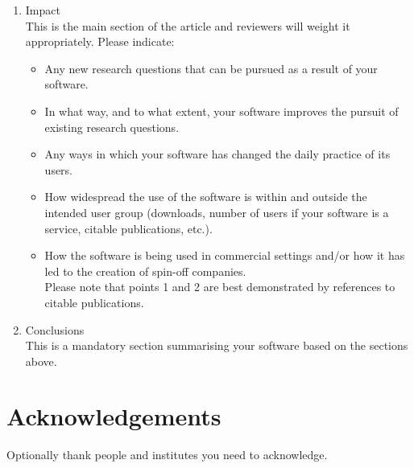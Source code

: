 \documentclass[preprint,12pt, a4paper]{elsarticle}
\begin{document}
\begin{enumerate}
\item Impact\\

This is the main section of the article and reviewers will weight it appropriately.
Please indicate:

\begin{itemize}
    \item Any new research questions that can be pursued as a result of your software.
    \item In what way, and to what extent, your software improves the pursuit of existing research questions.
    \item Any ways in which your software has changed the daily practice of its users.
    \item How widespread the use of the software is within and outside the intended user group (downloads, number of users if your software is a service, citable publications, etc.).
    \item How the software is being used in commercial settings and/or how it has led to the creation of spin-off companies.\\
Please note that points 1 and 2 are best demonstrated by references to citable publications.\\
\end{itemize}


\item Conclusions\\

This is a mandatory section summarising your software based on the sections above.


\end{enumerate}

\section*{Acknowledgements}
\label{}

Optionally thank people and institutes you need to acknowledge. 



\end{document}
